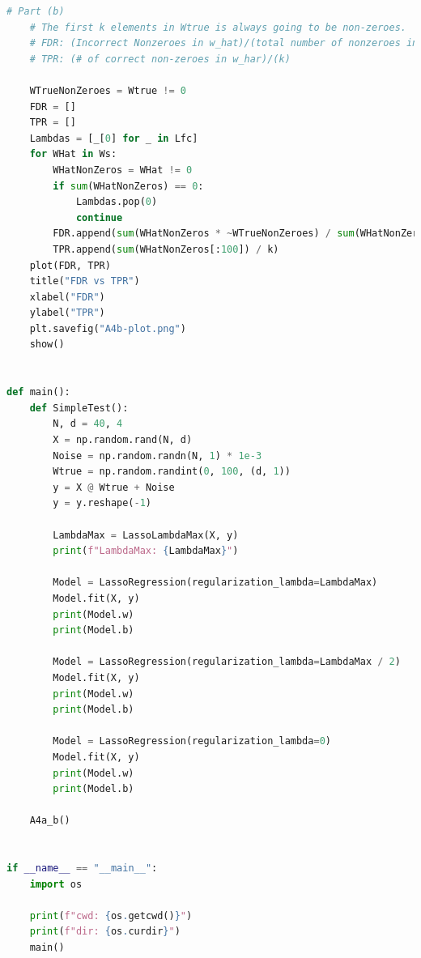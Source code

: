 \documentclass[]{article}
\begin{document}
\begin{lstlisting}[language=python]
    # Part (b)
    # The first k elements in Wtrue is always going to be non-zeroes.
    # FDR: (Incorrect Nonzeroes in w_hat)/(total number of nonzeroes in w_hat)
    # TPR: (# of correct non-zeroes in w_har)/(k)

    WTrueNonZeroes = Wtrue != 0
    FDR = []
    TPR = []
    Lambdas = [_[0] for _ in Lfc]
    for WHat in Ws:
        WHatNonZeros = WHat != 0
        if sum(WHatNonZeros) == 0:
            Lambdas.pop(0)
            continue
        FDR.append(sum(WHatNonZeros * ~WTrueNonZeroes) / sum(WHatNonZeros))
        TPR.append(sum(WHatNonZeros[:100]) / k)
    plot(FDR, TPR)
    title("FDR vs TPR")
    xlabel("FDR")
    ylabel("TPR")
    plt.savefig("A4b-plot.png")
    show()


def main():
    def SimpleTest():
        N, d = 40, 4
        X = np.random.rand(N, d)
        Noise = np.random.randn(N, 1) * 1e-3
        Wtrue = np.random.randint(0, 100, (d, 1))
        y = X @ Wtrue + Noise
        y = y.reshape(-1)

        LambdaMax = LassoLambdaMax(X, y)
        print(f"LambdaMax: {LambdaMax}")

        Model = LassoRegression(regularization_lambda=LambdaMax)
        Model.fit(X, y)
        print(Model.w)
        print(Model.b)

        Model = LassoRegression(regularization_lambda=LambdaMax / 2)
        Model.fit(X, y)
        print(Model.w)
        print(Model.b)

        Model = LassoRegression(regularization_lambda=0)
        Model.fit(X, y)
        print(Model.w)
        print(Model.b)

    A4a_b()


if __name__ == "__main__":
    import os

    print(f"cwd: {os.getcwd()}")
    print(f"dir: {os.curdir}")
    main()        
    \end{lstlisting}
\end{document}
